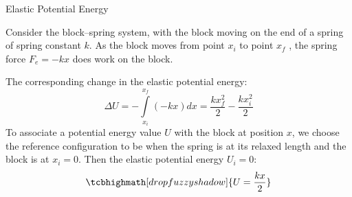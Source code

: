 \documentclass[18pt]{LectMechanics}
\begin{document}
\begin{frame}{Elastic Potential Energy}{}
	\begin{minipage}{0.6\linewidth}
		Consider the block–spring system, with the block moving on the end of a spring of spring constant $k$. As the block moves from point $x_i$ to point $x_f$ , the spring force $F_e = -kx$ does work on the block.
	\end{minipage}%
	\begin{minipage}{0.4\linewidth}
		\begin{center}
		\end{center}
	\end{minipage}\vspace*{1ex}

	The corresponding change in the elastic potential energy:
	\begin{equation*}
		\Delta U = -\int\limits_{x_i}^{x_f} (-kx) dx = \frac{kx_f^2}{2} - \frac{kx_i^2}{2}
	\end{equation*}
	To associate a potential energy value $U$ with the block at position $x$, we choose the reference configuration to be when the spring is at its relaxed length and the block is at $x_i = 0$. Then the elastic potential energy $U_i = 0$:
	\begin{equation*}
		\tcbhighmath[drop fuzzy shadow]{U = \frac{kx}{2}}
	\end{equation*}
\end{frame}
\end{document}
